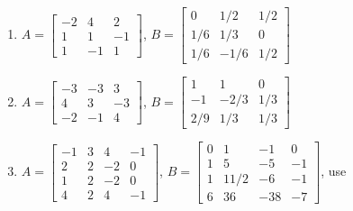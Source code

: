 \begin{exercise}
\begin{enumerate}
\item \(A=\begin{bmatrix} -2&4&2
\\1&1&-1
\\1&-1&1 \end{bmatrix}\), 
\(B=\begin{bmatrix} 0&1/2&1/2
\\1/6&1/3&0
\\1/6&-1/6&1/2 \end{bmatrix}\)


\item \(A=\begin{bmatrix} -3&-3&3
\\4&3&-3
\\-2&-1&4 \end{bmatrix}\), 
\(B=\begin{bmatrix} 1&1&0
\\-1&-2/3&1/3
\\2/9&1/3&1/3 \end{bmatrix}\)


\item \(A=\begin{bmatrix} -1&3&4&-1
\\2&2&-2&0
\\1&2&-2&0
\\4&2&4&-1 \end{bmatrix}\), 
\setbox\ajrqrbox\hbox{}%
\marginajrbox%
\(B=\begin{bmatrix} 0&1&-1&0
\\1&5&-5&-1
\\1&11/2&-6&-1
\\6&36&-38&-7 \end{bmatrix}\), use \script
{}


\end{enumerate}
\end{exercise}
